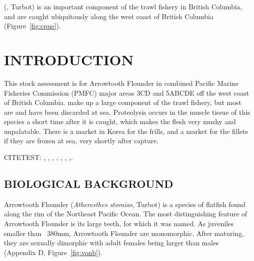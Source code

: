 

\fishname (\emph{\sciencename}, Turbot) is an important component of the trawl fishery in British Columbia, and are caught ubiquitously along the west coast of British Columbia (Figure~\ref{fig:cpue}).




\clearpage

\setcounter{page}{1}

\section{INTRODUCTION}

This stock assessment is for Arrowtooth Flounder in combined Pacific Marine Fisheries Commission (PMFC) major areas 3CD and 5ABCDE off the west coast of British Columbia. \fishname make up a large component of the trawl fishery, but most are and have been discarded at sea. Proteolysis occurs in the muscle tissue of this species a short time after it is caught, which makes the flesh very mushy and unpalatable. There is a market in Korea for the frills, and a market for the fillets if they are frozen at sea, very shortly after capture.

CITETEST: \citet{arf1995}, \citet{arf1999a}, \citet{arf1999b}, \citet{arf2000}, \citet{arf2001}, \citet{arf2003}, \citet{arf2006},\citet{arf2013}.

\subsection{BIOLOGICAL BACKGROUND}

Arrowtooth Flounder (\emph{Atheresthes stomias}, Turbot) is a species of flatfish found along the rim of the Northeast Pacific Ocean. The most distinguishing feature of Arrowtooth Flounder is its large teeth, for which it was named. As juveniles smaller than ~380mm, Arrowtooth Flounder are monomorphic. After maturing, they are sexually dimorphic with adult females being larger than males (Appendix D, Figure~\ref{fig:vonb}).


